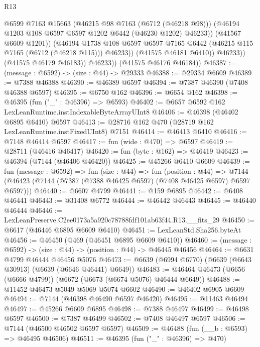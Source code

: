 \begin{lexlean}{R13}
\begin{coremodule}
                        @6599
                        @7163
                        @15663
                        (@46215 @98 @7163 (@6712 (@46218 @98)))
                        (@46194 @1203 @108 @6597 @6597 @1202 @6442 (@46230 @1202) @46233))
                      (@41567 @6609 @1201))
                    (@46194
                      @1738
                      @108
                      @6597
                      @6597
                      @7165
                      @6442
                      (@46215 @115 @7165 (@6712 (@46218 @115)))
                      @46233))
                  (@41575 @46181 @6410))
                @46233))
            (@41575 @46179 @46183))
          @46233))
      (@41575 @46176 @46184))
@46387 := (message : @6592) -> (size : @44) -> @29333
@46388 := @29334 @6609
@46389 := @7388 @46388
@46390 := @46389 @6597
@46394 := @7387 @46390 (@7408 @46388 @6597)
@46395 := @6750 @162
@46396 := @6654 @162
@46398 := @46395 (fun ("_" : @46396) => @6593)
@46402 := @6657 @6592 @162 LexLeanRuntime.instIndexableByteArrayUInt8
@46406 := @46398 (@46402 @6895 @6410) @6597
@46413 := @28716 @162 @470 (@28719 @162 LexLeanRuntime.instFixedUInt8) @7151
@46414 := @46413 @6410
@46416 := @7148 @46414 @6597
@46417 := fun (wide : @470) => @6597
@46419 := @28711 (@46416 @46417)
@46420 := fun (byte : @162) => @46419
@46423 := @46394 (@7144 (@46406 @46420))
@46425 := @45266 @6410 @6609
@46439 := fun (message : @6592) =>
  fun (size : @44) =>
  fun (position : @44) =>
  @7144 (@46423 (@7144 (@7387 (@7388 @46425 @6597) (@7408 @46425 @6597) @6597 @6597)))
@46440 := @6607 @4799
@46441 := @159 @6895
@46442 := @6408 @46441
@46443 := @31408 @6772
@46444 := @46442 @46443
@46445 := @46440 @46444
@46446 := LexLeanPreserve.C2ee0173a5a920c78788fdf101ab63f44.R13.__fits_29
@46450 := @6617 (@46446 @6895 @6609 @6410)
@46451 := LexLeanStd.Sha256.byteAt
@46456 := @46450 (@469 (@46451 @6895 @6609 @6410))
@46460 := (message : @6592) -> (size : @44) -> (position : @44) -> @46445 @46456
@46464 := @6631 @4799 @46444 @46456 @5076
@46473 := @6639 (@6994 @6770) (@6639 (@6643 @30913) (@6639 (@6646 @46441) @6649))
@46483 := @46464 @46473 (@6656 (@6666 @4799)) (@6672 (@6673 (@6674 @5076) @46444 @6649))
@46488 := @11452 @46473 @5049 @5069 @5074 @6602
@46490 := @46402 @6905 @6609
@46494 := @7144 (@46398 @46490 @6597 @46420)
@46495 := @11463 @46494
@46497 := @45266 @6609 @6895
@46498 := @7388 @46497
@46499 := @46498 @6597
@46500 := @7387 @46499
@46502 := @7408 @46497 @6597
@46506 := @7144 (@46500 @46502 @6597 @6597)
@46509 := @46488 (fun (__b : @6593) => @46495 @46506)
@46511 := @46395 (fun ("_" : @46396) => @470)

\end{coremodule}
\end{lexlean}
